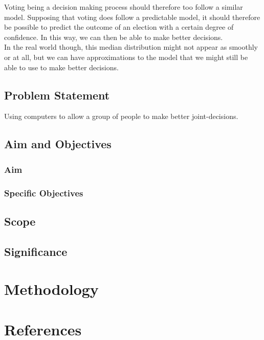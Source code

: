 \documentclass[12pt, a4paper]{report}
\begin{document}
Voting being a decision making process should therefore too follow a similar model. Supposing
that voting does follow a predictable model, it should therefore be possible to predict
the outcome of an election with a certain degree of confidence. In this way, we can then
be able to make better decisions.\\

In the real world though, this median distribution might not appear as smoothly or at all,
but we can have approximations to the model that we might still be able to use to make
better decisions.
\subsection*{Problem Statement}
Using computers to allow a group of people to make better joint-decisions.
\subsection*{Aim and Objectives}
\subsubsection*{Aim}
\subsubsection*{Specific Objectives}
\subsection*{Scope}
\subsection*{Significance}
\section*{Methodology}
\section*{References}
\end{document}
